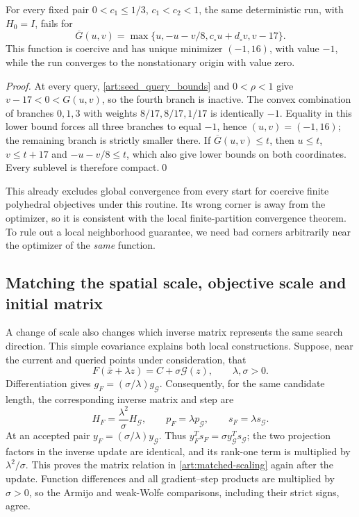 \begin{corollary}\label{art:failure_polyhedral}
For every fixed pair $0<c_1\le1/3$, $c_1<c_2<1$, the same deterministic run,
with $H_0=I$, fails for
\[
 \overline G(u,v)=\max\{u,-u-v/8,c_\circ u+d_\circ v,v-17\}.
\]
This function is coercive and has unique minimizer $(-1,16)$, with value
$-1$, while the run converges to the nonstationary origin with value zero.
\end{corollary}
\begin{proof}
At every query, \eqref{art:seed_query_bounds} and $0<\rho<1$ give
$v-17<0<G(u,v)$, so the fourth branch is inactive. The convex combination
of branches $0,1,3$ with weights $8/17,8/17,1/17$ is identically $-1$.
Equality in this lower bound forces all three branches to equal $-1$,
hence $(u,v)=(-1,16)$; the remaining branch is strictly smaller there.
If $\overline G(u,v)\le t$, then
$u\le t$, $v\le t+17$ and $-u-v/8\le t$, which also give lower bounds
on both coordinates. Every sublevel is therefore compact.\qed
\end{proof}
This already excludes global convergence from every start for coercive finite
polyhedral objectives under this routine. Its wrong corner is away from the
optimizer, so it is consistent with the local finite-partition convergence
theorem. To rule out a local neighborhood guarantee, we need bad corners
arbitrarily near the optimizer of the \emph{same} function.

\subsection{Matching the spatial scale, objective scale and initial matrix}
A change of scale also changes which inverse matrix represents the same
search direction. This simple covariance explains both local constructions.
Suppose, near the current and queried points under consideration, that
\begin{equation}\label{art:matched-local-model}
 F(\bar x+\lambda z)=C+\sigma\mathcal G(z),\qquad \lambda,\sigma>0.
\end{equation}
Differentiation gives $g_F=(\sigma/\lambda)g_{\mathcal G}$. Consequently,
for the same candidate length, the corresponding inverse matrix and step are
\begin{equation}\label{art:matched-scaling}
 H_F=\frac{\lambda^2}{\sigma}H_{\mathcal G},\qquad
 p_F=\lambda p_{\mathcal G},\qquad s_F=\lambda s_{\mathcal G}.
\end{equation}
At an accepted pair $y_F=(\sigma/\lambda)y_{\mathcal G}$. Thus
$y_F^Ts_F=\sigma y_{\mathcal G}^Ts_{\mathcal G}$; the two projection
factors in the inverse update are identical, and its rank-one term is
multiplied by $\lambda^2/\sigma$. This proves the matrix relation in
\eqref{art:matched-scaling} again after the update. Function differences
and all gradient--step products are multiplied by $\sigma>0$, so the
Armijo and weak-Wolfe comparisons, including their strict signs, agree.

